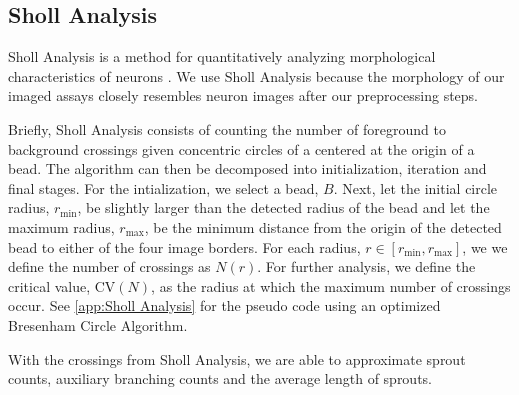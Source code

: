 \documentclass{sig-alternate}
\begin{document}

	\subsection{Sholl Analysis} %
	\label{sub:Sholl Analysis}
		Sholl Analysis is a method for quantitatively analyzing morphological
		characteristics of neurons \cite{sholl53}.  We use Sholl Analysis
		because the morphology of our imaged assays closely resembles neuron
		images after our preprocessing steps.

		Briefly, Sholl Analysis consists of counting the number of
		foreground to background crossings given concentric circles of a
		centered at the origin of a bead. The algorithm can then be
		decomposed into initialization, iteration and final stages. For
		the intialization, we select a bead, $B$. Next, let the initial
		circle radius, $r_{\min}$, be slightly larger than the detected
		radius of the bead and let the maximum radius, $r_{\max}$, be the
		minimum distance from the origin of the detected bead to either of
		the four image borders. For each radius, $r \in [r_{\min},
		r_{\max}]$, we we define the number of crossings as $N(r)$. For further analysis,
		we define the critical value, $\text{CV}(N)$, as the radius at which
		the maximum number of crossings occur. See \ref{app:Sholl
		Analysis} for the pseudo code using an optimized Bresenham Circle
		Algorithm.

		With the crossings from Sholl Analysis, we are able to approximate
		sprout counts, auxiliary branching counts and the average length of
		sprouts.
		

\end{document}
